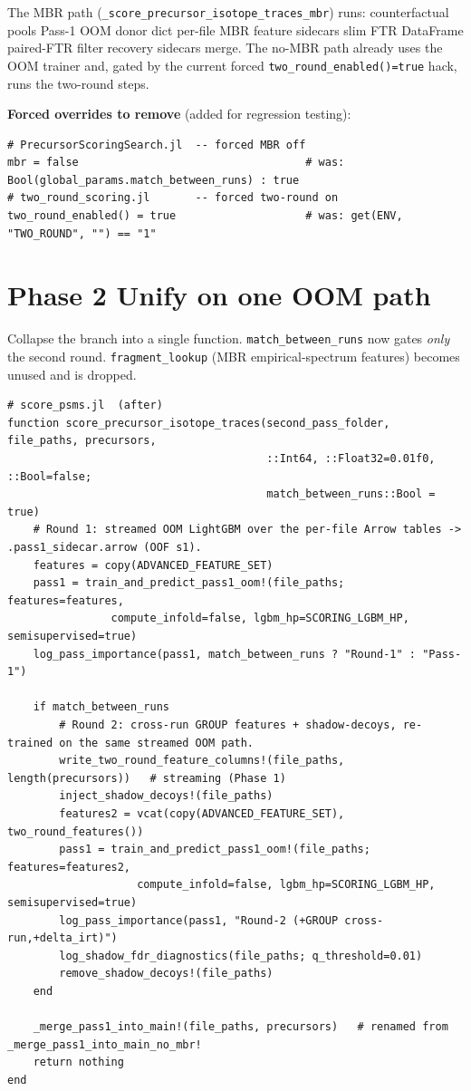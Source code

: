 \documentclass[10pt]{article}
\begin{document}
The MBR path (\verb|_score_precursor_isotope_traces_mbr|) runs: counterfactual pools \textrightarrow{}
Pass-1 OOM \textrightarrow{} donor dict \textrightarrow{} per-file MBR feature sidecars \textrightarrow{}
slim FTR DataFrame \textrightarrow{} paired-FTR filter \textrightarrow{} recovery sidecars \textrightarrow{}
merge. The no-MBR path already uses the OOM trainer and, gated by the current forced
\texttt{two\_round\_enabled()=true} hack, runs the two-round steps.

\textbf{Forced overrides to remove} (added for regression testing):
\begin{lstlisting}
# PrecursorScoringSearch.jl  -- forced MBR off
mbr = false                                   # was: Bool(global_params.match_between_runs) : true
# two_round_scoring.jl       -- forced two-round on
two_round_enabled() = true                    # was: get(ENV, "TWO_ROUND", "") == "1"
\end{lstlisting}

\section{Phase 2 \textemdash{} Unify on one OOM path}

Collapse the branch into a single function. \texttt{match\_between\_runs} now gates \emph{only} the
second round. \texttt{fragment\_lookup} (MBR empirical-spectrum features) becomes unused and is dropped.

\begin{lstlisting}
# score_psms.jl  (after)
function score_precursor_isotope_traces(second_pass_folder, file_paths, precursors,
                                        ::Int64, ::Float32=0.01f0, ::Bool=false;
                                        match_between_runs::Bool = true)
    # Round 1: streamed OOM LightGBM over the per-file Arrow tables -> .pass1_sidecar.arrow (OOF s1).
    features = copy(ADVANCED_FEATURE_SET)
    pass1 = train_and_predict_pass1_oom!(file_paths; features=features,
                compute_infold=false, lgbm_hp=SCORING_LGBM_HP, semisupervised=true)
    log_pass_importance(pass1, match_between_runs ? "Round-1" : "Pass-1")

    if match_between_runs
        # Round 2: cross-run GROUP features + shadow-decoys, re-trained on the same streamed OOM path.
        write_two_round_feature_columns!(file_paths, length(precursors))   # streaming (Phase 1)
        inject_shadow_decoys!(file_paths)
        features2 = vcat(copy(ADVANCED_FEATURE_SET), two_round_features())
        pass1 = train_and_predict_pass1_oom!(file_paths; features=features2,
                    compute_infold=false, lgbm_hp=SCORING_LGBM_HP, semisupervised=true)
        log_pass_importance(pass1, "Round-2 (+GROUP cross-run,+delta_irt)")
        log_shadow_fdr_diagnostics(file_paths; q_threshold=0.01)
        remove_shadow_decoys!(file_paths)
    end

    _merge_pass1_into_main!(file_paths, precursors)   # renamed from _merge_pass1_into_main_no_mbr!
    return nothing
end
\end{lstlisting}
\end{document}
